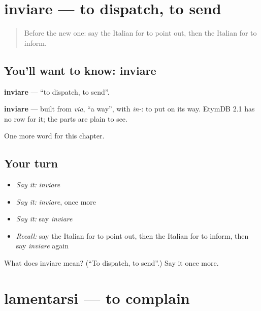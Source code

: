 \section[inviare]{inviare — to dispatch, to send}

\label{lesson:IT-C238-inviare}



\begin{quote}
Before the new one: say the Italian for to point out, then the Italian for to inform.
\end{quote}

\subsection*{You'll want to know: inviare}
\textbf{inviare} — \textquotedblleft{}to dispatch, to send\textquotedblright{}.

\begin{cousinweb}
\textbf{inviare} — built from \emph{via}, \textquotedblleft{}a way\textquotedblright{}, with \emph{in-}: to put on its way. EtymDB 2.1 has no row for it; the parts are plain to see.
\end{cousinweb}

\begin{grammarlens}[title={What you've built}]
One more word for this chapter.
\end{grammarlens}

\subsection*{Your turn}
\begin{itemize}
\raggedright
  \item \emph{Say it:} \emph{inviare}
  \item \emph{Say it:} \emph{inviare}, once more
  \item \emph{Say it:} say \emph{inviare}
  \item \emph{Recall:} say the Italian for to point out, then the Italian for to inform, then say \emph{inviare} again
\end{itemize}

\begin{tcolorbox}[breakable,colback=teal!4,colframe=teal!35!black,title={Before you move on}]
What does inviare mean? (\textquotedblleft{}To dispatch, to send\textquotedblright{}.) Say it once more.
\end{tcolorbox}
\section[lamentarsi]{lamentarsi — to complain}


